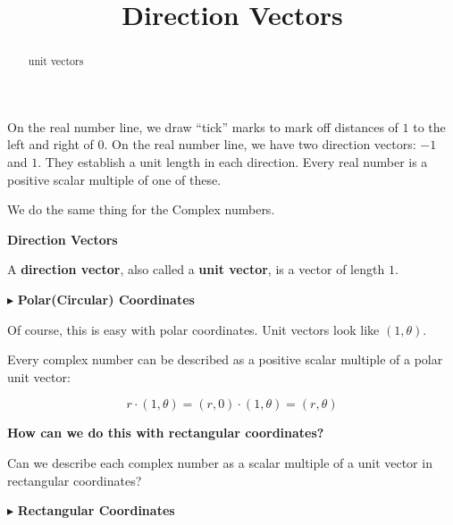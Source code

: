 \documentclass{ximera}
\title{Direction Vectors}
\begin{document}
\begin{abstract}
unit vectors
\end{abstract}
\maketitle




On the real number line, we draw ``tick'' marks to mark off distances of $1$ to the left and right of $0$. On the real number line, we have two direction vectors: $-1$ and $1$.  They establish a unit length in each direction. Every real number is a positive scalar multiple of one of these.

We do the same thing for the Complex numbers.









\begin{definition}  \textbf{\textcolor{green!50!black}{Direction Vectors}}   

A \textbf{direction vector}, also called a \textbf{unit vector}, is a vector of length $1$.

\end{definition}









$\blacktriangleright$ \textbf{\textcolor{blue!75!black}{Polar(Circular) Coordinates}}  


Of course, this is easy with polar coordinates.  Unit vectors look like $(1, \theta)$. 

Every complex number can be described as a positive scalar multiple of a polar unit vector:  


\[
r \cdot (1, \theta) = (r, 0) \cdot (1, \theta) = (r, \theta)
\]



\begin{center}
\textbf{\textcolor{red!70!black}{How can we do this with rectangular coordinates?}}
\end{center}



Can we describe each complex number as a scalar multiple of a unit vector in rectangular coordinates? 






$\blacktriangleright$ \textbf{\textcolor{blue!75!black}{Rectangular Coordinates}}  
\end{document}
